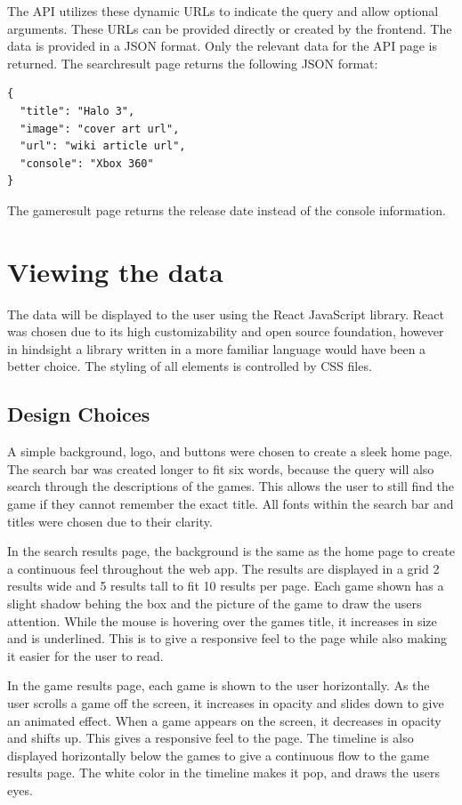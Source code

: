 The API utilizes these dynamic URLs to indicate the query and allow optional arguments. These URLs can be provided directly or created by the frontend. The data is provided in a JSON format. Only the relevant data for the API page is returned. The searchresult page returns the following JSON format:

\begin{minipage}[H]{\textwidth}
\begin{verbatim}
{
  "title": "Halo 3",
  "image": "cover art url",
  "url": "wiki article url",
  "console": "Xbox 360"
}
\end{verbatim}
\end{minipage}

The gameresult page returns the release date instead of the console information.

\section{Viewing the data}
The data will be displayed to the user using the React JavaScript library. React was chosen due to its high customizability and open source foundation, however in hindsight a library written in a more familiar language would have been a better choice. The styling of all elements is controlled by CSS files. 

\subsection{Design Choices}
A simple background, logo, and buttons were chosen to create a sleek home page. The search bar was created longer to fit six words, because the query will also search through the descriptions of the games. This allows the user to still find the game if they cannot remember the exact title. All fonts within the search bar and titles were chosen due to their clarity. 

In the search results page, the background is the same as the home page to create a continuous feel throughout the web app. The results are displayed in a grid 2 results wide and 5 results tall to fit 10 results per page. Each game shown has a slight shadow behing the box and the picture of the game to draw the users attention. While the mouse is hovering over the games title, it increases in size and is underlined. This is to give a responsive feel to the page while also making it easier for the user to read. 

In the game results page, each game is shown to the user horizontally. As the user scrolls a game off the screen, it increases in opacity and slides down to give an animated effect. When a game appears on the screen, it decreases in opacity and shifts up. This gives a responsive feel to the page. The timeline is also displayed horizontally below the games to give a continuous flow to the game results page. The white color in the timeline makes it pop, and draws the users eyes. 

